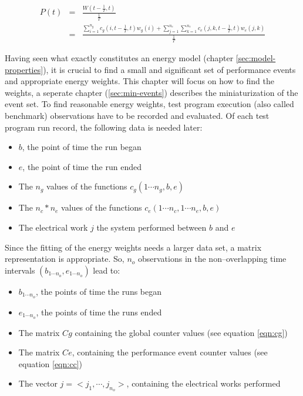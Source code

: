 \begin{eqnarray}
P(t) & = & \frac{W(t - \frac{1}{T}, t)}{\frac{1}{T}} \\
     & = & \frac{\sum\limits_{i=1}^{n_g} c_g(i, t - \frac{1}{T}, t) w_g(i) +
                 \sum\limits_{j=1}^{n_c}
                 \sum\limits_{k=1}^{n_e} c_e(j, k, t - \frac{1}{T}, t) w_e(j, k)
                }{\frac{1}{T}}
\end{eqnarray}


\label{sec:finding-weights}

Having seen what exactly constitutes an energy model (chapter
\ref{sec:model-properties}), it is crucial to find a small and significant set
of performance events and appropriate energy weights. This chapter will focus on
how to find the weights, a seperate chapter (\ref{sec:min-events}) describes the
miniaturization of the event set. To find reasonable energy weights, test
program execution (also called benchmark) observations have to be recorded and
evaluated. Of each test program run record, the following data is needed later:

\begin{itemize}

\item $b$, the point of time the run began

\item $e$, the point of time the run ended

\item The $n_g$ values of the functions $c_g(1 \cdots n_g, b, e)$

\item The $n_c * n_e$ values of the functions
$c_e(1 \cdots n_c, 1 \cdots n_e, b, e)$

\item The electrical work $j$ the system performed between $b$ and $e$

\end{itemize}

Since the fitting of the energy weights needs a larger data set, a matrix
representation is appropriate. So, $n_o$ observations in the non--overlapping
time intervals $(b_{1 \cdots n_o}, e_{1 \cdots n_o})$ lead to:

\begin{itemize}

\item $b_{1 \cdots n_o}$, the points of time the runs began

\item $e_{1 \cdots n_o}$, the points of time the runs ended

\item The matrix $Cg$ containing the global counter values (see equation
\ref{eqn:cg})

\item The matrix $Ce$, containing the performance event counter values (see
equation \ref{eqn:cc})

\item The vector $j = <j_1, \cdots, j_{n_o}>$, containing the electrical works
performed

\end{itemize}

